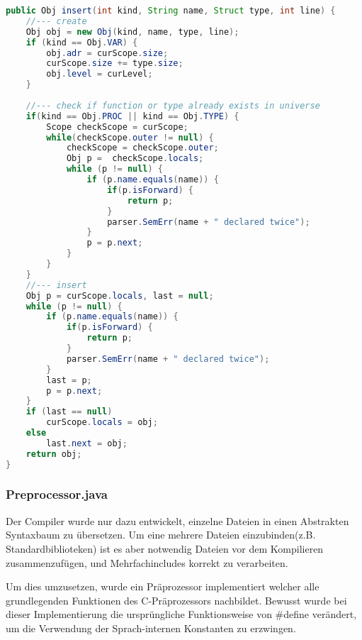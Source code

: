 \begin{lstlisting}[language=Java]
public Obj insert(int kind, String name, Struct type, int line) {
	//--- create
	Obj obj = new Obj(kind, name, type, line);
	if (kind == Obj.VAR) {
		obj.adr = curScope.size;
		curScope.size += type.size;
		obj.level = curLevel;
	}
	
	//--- check if function or type already exists in universe
	if(kind == Obj.PROC || kind == Obj.TYPE) {
		Scope checkScope = curScope;
		while(checkScope.outer != null) {
			checkScope = checkScope.outer;
			Obj p =  checkScope.locals;
			while (p != null) {
				if (p.name.equals(name)) {
					if(p.isForward) {
						return p;
					}
					parser.SemErr(name + " declared twice");
				}
				p = p.next;
			}
		}
	}
	//--- insert
	Obj p = curScope.locals, last = null;
	while (p != null) {
		if (p.name.equals(name)) {
			if(p.isForward) {
				return p;
			}
			parser.SemErr(name + " declared twice");
		}
		last = p;
		p = p.next;
	}
	if (last == null)
		curScope.locals = obj;
	else
		last.next = obj;
	return obj;
}
\end{lstlisting}




\subsubsection{Preprocessor.java}

Der Compiler wurde nur dazu entwickelt, einzelne Dateien in einen Abstrakten Syntaxbaum zu \"ubersetzen. Um eine mehrere Dateien einzubinden(z.B. Standardbiblioteken) ist es aber notwendig Dateien vor dem Kompilieren zusammenzuf\"ugen, und Mehrfachincludes korrekt zu verarbeiten.

Um dies umzusetzen, wurde ein Pr\"aprozessor implementiert welcher alle grundlegenden Funktionen des C-Pr\"aprozessors nachbildet. Bewusst wurde bei dieser Implementierung die urspr\"ungliche Funktionsweise von \#define ver\"andert, um die Verwendung der Sprach-internen Konstanten zu erzwingen.

